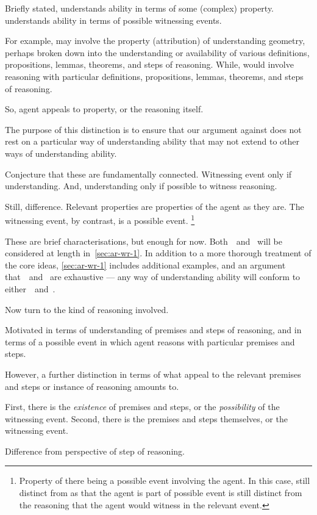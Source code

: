 \begin{note}
  Briefly stated,
  \AR{} understands ability in terms of some (complex) property.
  \WR{} understands ability in terms of possible witnessing events.

  For example, \AR{} may involve the property (attribution) of understanding geometry, perhaps broken down into the understanding or availability of various definitions, propositions, lemmas, theorems, and steps of reasoning.
  While, \WR{} would involve reasoning with particular definitions, propositions, lemmas, theorems, and steps of reasoning.

  So, agent appeals to property, or the reasoning itself.

  The purpose of this distinction is to ensure that our argument against \gESU{} does not rest on a particular way of understanding ability that may not extend to other ways of understanding ability.

  Conjecture that these are fundamentally connected.
  Witnessing event only if understanding.
  And, understanding only if possible to witness reasoning.

  Still, difference.
  Relevant properties are properties of the agent as they are.
  The witnessing event, by contrast, is a possible event.\nolinebreak
  \footnote{
    Property of there being a possible event involving the agent.
    In this case, still distinct from \WR{} as that the agent is part of possible event is still distinct from the reasoning that the agent would witness in the relevant event.
  }

  These are brief characterisations, but enough for now.
  Both~\AR{}~and~\WR{} will be considered at length in~\autoref{sec:ar-wr-1}.
  In addition to a more thorough treatment of the core ideas, \autoref{sec:ar-wr-1} includes additional examples, and an argument that~\AR{}~and~\WR{} are exhaustive --- any way of understanding ability will conform to either~\AR{}~and~\WR{}.
\end{note}

\begin{note}
  Now turn to the kind of reasoning involved.

  Motivated \AR{} in terms of understanding of premises and steps of reasoning, and \WR{} in terms of a possible event in which agent reasons with particular premises and steps.

  However, a further distinction in terms of what appeal to the relevant premises and steps or instance of reasoning amounts to.

  First, there is the \emph{existence} of premises and steps, or the \emph{possibility} of the witnessing event.
  Second, there is the premises and steps themselves, or the witnessing event.

  Difference from perspective of step of reasoning.
\end{note}


